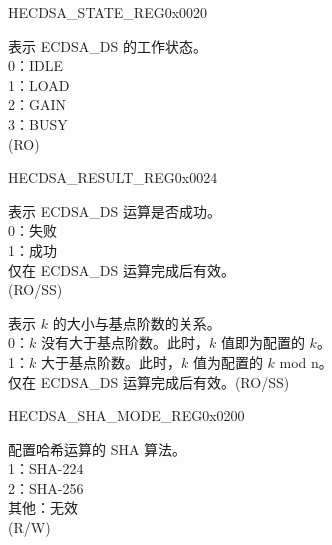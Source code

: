 \begin{register}{H}{ECDSA\_STATE\_REG}{0x0020}\label{regdesc:ECDSASTATEREG}
%
%
\regnewline%
\begin{regdesc}\begin{reglist}
\label{fielddesc:ECDSABUSY}\item [ECDSA\_BUSY] 表示 ECDSA\_DS 的工作状态。\\
0：IDLE\\
1：LOAD\\
2：GAIN\\
3：BUSY\\
(RO)
\end{reglist}\end{regdesc}
\end{register}


\begin{register}{H}{ECDSA\_RESULT\_REG}{0x0024}\label{regdesc:ECDSARESULTREG}
%
%
%
\regnewline%
\begin{regdesc}\begin{reglist}
\label{fielddesc:ECDSAOPERATIONRESULT}\item [ECDSA\_OPERATION\_RESULT] 表示 ECDSA\_DS 运算是否成功。\\
0：失败\\
1：成功\\
仅在 ECDSA\_DS 运算完成后有效。\\
(RO/SS)
\label{fielddesc:ECDSAKVALUEWARNING}\item [ECDSA\_K\_VALUE\_WARNING] 表示 $k$ 的大小与基点阶数的关系。\\
0：$k$ 没有大于基点阶数。此时，$k$ 值即为配置的 $k$。\\
1：$k$ 大于基点阶数。此时，$k$ 值为配置的 $k$ mod n。\\
仅在 ECDSA\_DS 运算完成后有效。(RO/SS)
\end{reglist}\end{regdesc}
\end{register}


\begin{register}{H}{ECDSA\_SHA\_MODE\_REG}{0x0200}\label{regdesc:ECDSASHAMODEREG}
%
%
\regnewline%
\begin{regdesc}\begin{reglist}
\label{fielddesc:ECDSASHAMODE}\item [ECDSA\_SHA\_MODE] 配置哈希运算的 SHA 算法。\\
1：SHA-224\\
2：SHA-256\\
其他：无效\\
(R/W)
\end{reglist}\end{regdesc}
\end{register}


